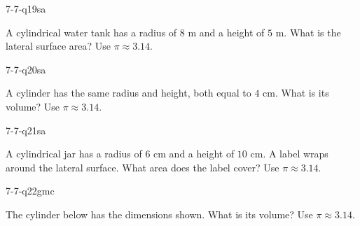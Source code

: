 \begin{practiceQuestion}{7-7-q19}{sa}
\begin{questionText}
A cylindrical water tank has a radius of $8$ m and a height of $5$ m. What is the lateral surface area? Use $\pi \approx 3.14$.
\end{questionText}
\end{practiceQuestion}

\begin{practiceQuestion}{7-7-q20}{sa}
\begin{questionText}
A cylinder has the same radius and height, both equal to $4$ cm. What is its volume? Use $\pi \approx 3.14$.
\end{questionText}
\end{practiceQuestion}

\begin{practiceQuestion}{7-7-q21}{sa}
\begin{questionText}
A cylindrical jar has a radius of $6$ cm and a height of $10$ cm. A label wraps around the lateral surface. What area does the label cover? Use $\pi \approx 3.14$.
\end{questionText}
\end{practiceQuestion}


\begin{practiceQuestion}{7-7-q22}{gmc}
\begin{questionText}
The cylinder below has the dimensions shown. What is its volume? Use $\pi \approx 3.14$.

\begin{center}
\end{center}
\end{questionText}
\end{practiceQuestion}

